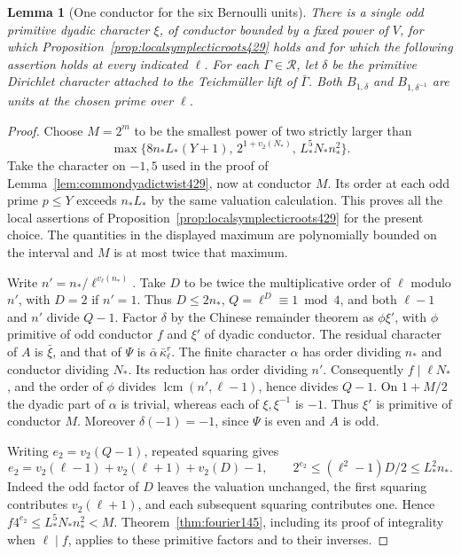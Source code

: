 \documentclass[a4paper,11pt]{article}
\newtheorem{lemma}[proposition]{Lemma}
\theoremstyle{definition}
\theoremstyle{remark}
\numberwithin{equation}{section}
\begin{document}
\begin{lemma}[One conductor for the six Bernoulli units]\leavevmode
\label{lem:uniformoddroots430}
There is a single odd primitive dyadic character \(\xi\), of
conductor bounded by a fixed power of \(V\), for which
Proposition~\ref{prop:localsymplecticroots429} holds and for
which the following assertion holds at every indicated \(\ell\).
For each \(\Gamma\in\mathcal R\), let \(\delta\) be the
primitive Dirichlet character attached to the Teichm\"uller
lift of \(\bar\Gamma\). Both \(B_{1,\delta}\) and
\(B_{1,\delta^{-1}}\) are units at the chosen prime over \(\ell\).
\end{lemma}
\begin{proof}
Choose \(M=2^m\) to be the smallest power of two strictly larger
than
\[
 \max\{8n_*L_*(Y+1),\,2^{1+v_2(N_*)},\,L_*^5N_* n_*^2\}.
\]
Take the character on \(-1,5\) used in the proof of
Lemma~\ref{lem:commondyadictwist429}, now at conductor \(M\).
Its order at each odd prime \(p\le Y\) exceeds \(n_*L_*\)
by the same valuation calculation. This proves all the local
assertions of Proposition~\ref{prop:localsymplecticroots429}
for the present choice. The quantities in the displayed maximum
are polynomially bounded on the interval and \(M\) is at most
twice that maximum.

Write \(n'=n_*/\ell^{v_\ell(n_*)}\). Take \(D\) to be twice the
multiplicative order of \(\ell\) modulo \(n'\), with \(D=2\)
if \(n'=1\). Thus \(D\le2n_*\), \(Q=\ell^D\equiv1\bmod4\),
and both \(\ell-1\) and \(n'\) divide \(Q-1\). Factor \(\delta\)
by the Chinese remainder theorem as \(\phi\xi'\), with \(\phi\)
primitive of odd conductor \(f\) and \(\xi'\) of dyadic conductor.
The residual character of \(A\) is \(\bar\xi\), and that of
\(\Psi\) is \(\bar\alpha\,\bar\kappa_\ell^r\). The finite
character \(\alpha\) has order dividing \(n_*\) and conductor
dividing \(N_*\). Its reduction has order dividing \(n'\).
Consequently \(f\mid\ell N_*\), and the order of \(\phi\) divides
\(\operatorname{lcm}(n',\ell-1)\), hence divides \(Q-1\).
On \(1+M/2\) the dyadic part of \(\alpha\) is trivial, whereas
each of \(\xi,\xi^{-1}\) is \(-1\). Thus \(\xi'\) is primitive
of conductor \(M\). Moreover \(\delta(-1)=-1\), since
\(\Psi\) is even and \(A\) is odd.

Writing \(e_2=v_2(Q-1)\), repeated squaring gives
\[
 e_2=v_2(\ell-1)+v_2(\ell+1)+v_2(D)-1,\qquad
 2^{e_2}\le(\ell^2-1)D/2\le L_*^2n_*.
\]
Indeed the odd factor of \(D\) leaves the valuation unchanged,
the first squaring contributes \(v_2(\ell+1)\), and each
subsequent squaring contributes one. Hence
\(f4^{e_2}\le L_*^5N_*n_*^2<M\).
Theorem~\ref{thm:fourier145}, including its proof of integrality
when \(\ell\mid f\), applies to these primitive factors and to
their inverses.
\end{proof}
\end{document}
